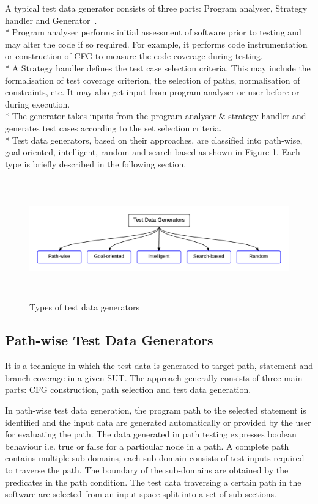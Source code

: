 A typical test data generator consists of three parts: Program analyser, Strategy handler and Generator~\cite{edvardsson1999survey}. \\*
Program analyser performs initial assessment of software prior to testing and may alter the code if so required. For example, it performs code instrumentation or construction of CFG to measure the code coverage during testing.\\*
A Strategy handler defines the test case selection criteria. This may include the formalisation of test coverage criterion, the selection of paths, normalisation of constraints, etc. It may also get input from program analyser or user before or during execution.\\*
The generator takes inputs from the program analyser \& strategy handler and generates test cases according to the set selection criteria.\\*
Test data generators, based on their approaches, are classified into path-wise, goal-oriented, intelligent, random and search-based as shown in Figure \ref{testDataGenerators_2}. Each type is briefly described in the following section.
\begin{figure}[h]
	\centering
	\centerline{\includegraphics[width=16.5cm, height=5.2cm ]{chapter2/Generators.png}}
	\caption{Types of test data generators}
	\label{testDataGenerators_2}
\end{figure}

\subsection{Path-wise Test Data Generators} 
\label{sec:pathwise_2}
It is a technique in which the test data is generated to target path, statement and branch coverage in a given SUT. The approach generally consists of three main parts: CFG construction, path selection and test data generation. 

In path-wise test data generation, the program path to the selected statement is identified and the input data are generated automatically or provided by the user for evaluating the path. The data generated in path testing expresses boolean behaviour i.e. true or false for a particular node in a path. A complete path contains multiple sub-domains, each sub-domain consists of test inputs required to traverse the path. The boundary of the sub-domains are obtained by the predicates in the path condition. The test data traversing a certain path in the software are selected from an input space split into a set of sub-sections. 

